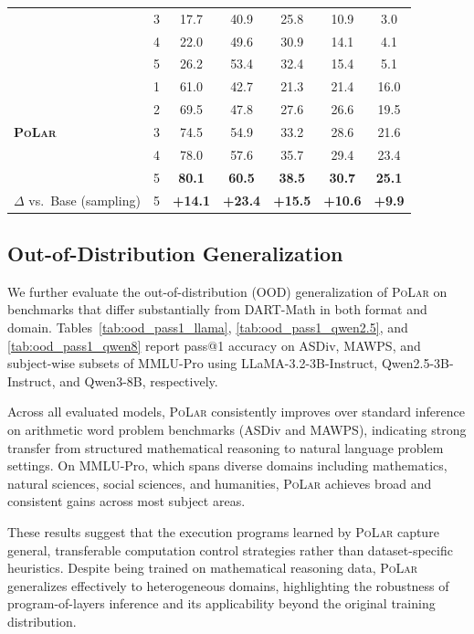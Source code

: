 \documentclass{article}
\theoremstyle{plain}
\theoremstyle{definition}
\theoremstyle{remark}
\newcommand\ours{\textsc{PoLar}\xspace}
\begin{document}
\begin{table}[t]
{\begin{tabular}{llccccc}
& 3 & 17.7 & 40.9 & 25.8 & 10.9 & 3.0 \\
& 4 & 22.0 & 49.6 & 30.9 & 14.1 & 4.1 \\
& 5 & 26.2 & 53.4 & 32.4 & 15.4 & 5.1 \\
\midrule
\multirow{5}{*}{\textbf{\ours}}
& 1 & 61.0 & 42.7 & 21.3 & 21.4 & 16.0 \\
& 2 & 69.5 & 47.8 & 27.6 & 26.6 & 19.5 \\
& 3 & 74.5 & 54.9 & 33.2 & 28.6 & 21.6 \\
& 4 & 78.0 & 57.6 & 35.7 & 29.4 & 23.4 \\
\rowcolor{blue!10}
& 5 & \textbf{80.1} & \textbf{60.5} & \textbf{38.5} & \textbf{30.7} & \textbf{25.1} \\
\midrule
$\Delta$ vs.\ Base (sampling) & 5 & \textbf{+14.1} & \textbf{+23.4} & \textbf{+15.5} & \textbf{+10.6} & \textbf{+9.9} \\
\bottomrule
\end{tabular}}
\end{table}


\subsection{Out-of-Distribution Generalization}
\label{app:ood_pref}

We further evaluate the out-of-distribution (OOD) generalization of \ours on benchmarks that differ substantially from DART-Math in both format and domain.
Tables~\ref{tab:ood_pass1_llama}, \ref{tab:ood_pass1_qwen2.5}, and \ref{tab:ood_pass1_qwen8} report pass@1 accuracy on ASDiv, MAWPS, and subject-wise subsets of MMLU-Pro using LLaMA-3.2-3B-Instruct, Qwen2.5-3B-Instruct, and Qwen3-8B, respectively.

Across all evaluated models, \ours consistently improves over standard inference on arithmetic word problem benchmarks (ASDiv and MAWPS), indicating strong transfer from structured mathematical reasoning to natural language problem settings.
On MMLU-Pro, which spans diverse domains including mathematics, natural sciences, social sciences, and humanities, \ours achieves broad and consistent gains across most subject areas.

These results suggest that the execution programs learned by \ours capture general, transferable computation control strategies rather than dataset-specific heuristics.
Despite being trained on mathematical reasoning data, \ours generalizes effectively to heterogeneous domains, highlighting the robustness of program-of-layers inference and its applicability beyond the original training distribution.
\end{document}
